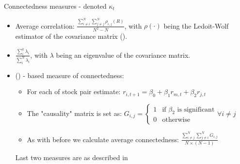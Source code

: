 \documentclass{beamer}
\begin{document}
\begin{frame}{Connectedness measures - denoted $\kappa_t$}

\begin{itemize}
    \item Average correlation: $\frac{\sum_{i \neq i}^{N} \sum_{j \neq j}^{N} \rho_{i,j}(R)}{N^2-N}$,  with $\rho(\cdot)$ being the Ledoit-Wolf estimator of the covariance matrix (\cite{ledoit}).
    \item $\frac{\sum_{i}^{k} \lambda_i}{\sum_{i}^{N} \lambda_i}$, with $\lambda$ being an eigenvalue of the covariance matrix. 
    \item (\cite{granger}) - based measure of connectedness:
    \begin{itemize}
        \item For each of stock pair estimate: $r_{i,t+1} = \beta_0 + \beta_1 r_{m, t} + \beta_2 r_{j, t}$
        \item The "causality" matrix is set as: $G_{i,j} = \begin{cases}
            1  & \text{if } \beta_2 \text{ is significant} \\
            0 & \text{otherwise}
          \end{cases} \forall i \neq j$
        \item As with before we calculate average connectedness: $\frac{\sum_{i \neq j}^{N} \sum_{j \neq i}^{N} G_{i,j}}{ N \times (N-1)}$
    \end{itemize}

    Last two measures are as described in \cite{billio}
\end{itemize}

\end{frame}
\end{document}

